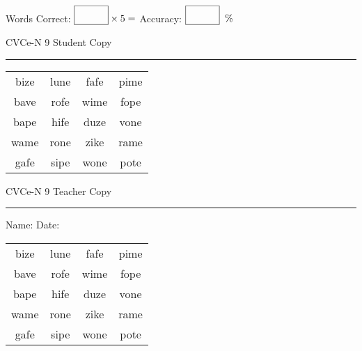\documentclass{memoir}
\begin{document}
\small

Words Correct: $\fbox{\phantom{\huge 100}} \times 5 = $ Accuracy: $\fbox{\phantom{\huge 100}}\;\; \%$ 

\vfill

\newpage


\footnotesize \noindent
CVCe-N 9 \hfill Student Copy
\smallskip
\hrule

\Large

\setlength{\tabcolsep}{14pt}
\def\arraystretch{2}

{\selectfont


\begin{vplace}[0.5]
\begin{center}
\begin{tabular}{cccc}
bize & lune & fafe & pime \\
bave & rofe & wime & fope \\
bape & hife & duze & vone \\
wame & rone & zike & rame \\
gafe & sipe & wone & pote \\
\end{tabular}
\end{center}
\end{vplace}

}

\newpage

\footnotesize \noindent
CVCe-N 9 \hfill Teacher Copy
\smallskip
\hrule

\small

\vfill

\noindent
Name: \underline{\hspace{1.75in}} \hfill Date: \underline{\hspace{1in}}

\Large

{\selectfont


\begin{vplace}[0.5]
\begin{center}
\begin{tabular}{cccc}
bize & lune & fafe & pime \\
bave & rofe & wime & fope \\
bape & hife & duze & vone \\
wame & rone & zike & rame \\
gafe & sipe & wone & pote \\
\end{tabular}
\end{center}
\end{vplace}



}
\end{document}
